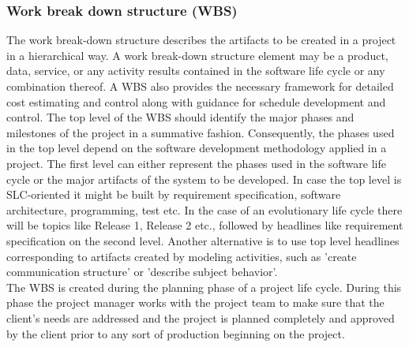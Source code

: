 \subsubsection{\textbf{Work break down structure (WBS)}}
The work break-down structure describes the artifacts to be created in a project in a hierarchical way. A work break-down structure element may be a product, data, service, or any activity results contained in the software life cycle or any combination thereof. A WBS also provides the necessary framework for detailed cost estimating and control along with guidance for schedule development and control. The top level of the WBS should identify the major phases and milestones of the project in a summative fashion. Consequently, the phases used in the top level depend on the software development methodology applied in a project. The first level can either represent the phases used in the software life cycle or the major artifacts of the system to be developed. In case the top level is SLC-oriented it might be built by requirement specification, software architecture, programming, test etc. In the case of an evolutionary life cycle there will be topics like Release 1, Release 2 etc., followed by headlines like requirement specification on the second level.
Another alternative is to use top level headlines corresponding to artifacts created by modeling activities, such as 'create communication structure' or 'describe subject behavior'. 
\\
The WBS is created during the planning phase of a project life cycle. During this phase the project manager works with the project team to make sure that the client's needs are addressed and the project is planned completely and approved by the client prior to any sort of production beginning on the project.

